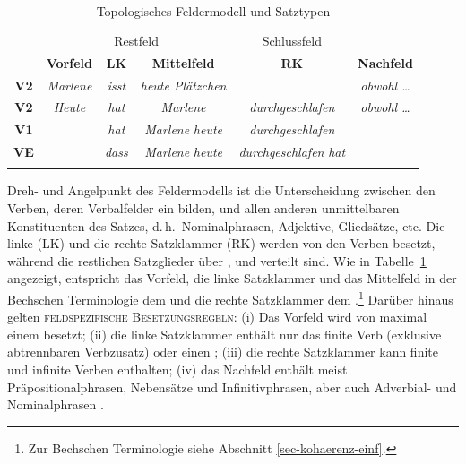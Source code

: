 \begin{table}[t]
\centering
\begin{tabular}{cccccc}
\lsptoprule
& \multicolumn{3}{c}{Restfeld} & Schlussfeld \\
\cmidrule(r){2-4}\cmidrule(lr){5-5}
& {\bf Vorfeld} & {\bf LK} & {\bf Mittelfeld} & {\bf RK} & {\bf Nachfeld} \\
\cmidrule[\heavyrulewidth]{2-6}
\textbf{V2} &{\it Marlene} & {\it isst} & {\it heute Plätzchen} & & {\it obwohl \ldots}  \\
\textbf{V2} & {\it Heute} & {\it hat} & {\it Marlene} & {\it durchgeschlafen} & {\it obwohl \ldots}  \\
\textbf{V1} & & {\it hat} & {\it Marlene} {\it heute} & {\it durchgeschlafen} &  \\
\textbf{VE} & & {\it dass} & {\it Marlene} {\it heute} & {\it durchgeschlafen} {\it hat} & \\
\lspbottomrule
\end{tabular}
\caption{\label{ex-feldermodell}Topologisches Feldermodell und Satztypen}
\end{table}

Dreh- und Angelpunkt des Feldermodells ist die Unterscheidung zwischen den Verben, deren Verbalfelder ein  bilden, und allen anderen unmittelbaren Konstituenten des Satzes, d.\,h.\ Nominalphrasen, Adjektive, Gliedsätze, etc. Die linke  (LK) und die rechte Satzklammer (RK) werden von den Verben besetzt, während die restlichen Satzglieder über ,  und  verteilt sind. Wie in Tabelle~\ref{ex-feldermodell} angezeigt, entspricht das Vorfeld, die linke Satzklammer und das Mittelfeld in der Bechschen Terminologie dem  und die rechte Satzklammer dem .\footnote{Zur Bechschen Terminologie siehe Abschnitt \ref{sec-kohaerenz-einf}.} Darüber hinaus gelten \textsc{feldspezifische Besetzungsregeln}: (i) Das Vorfeld wird von maximal einem  besetzt; (ii) die linke Satzklammer enthält nur das finite Verb (exklusive abtrennbaren Verbzusatz) oder einen ; (iii) die rechte Satzklammer kann finite und infinite Verben enthalten; (iv) das Nachfeld enthält meist Präpositionalphrasen, Nebensätze und Infinitivphrasen, aber auch Adverbial- und Nominalphrasen \citep[Kapitel~13]{Mueller:99}.

